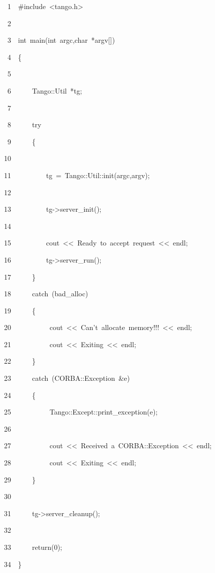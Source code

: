 \begin{lyxcode}
~~~~~1~~\#include~<tango.h>

~~~~~2~~

~~~~~3~~int~main(int~argc,char~{*}argv{[}{]})

~~~~~4~~\{

~~~~~5~~

~~~~~6~~~~~~Tango::Util~{*}tg;

~~~~~7~~~~~~~~~~

~~~~~8~~~~~~try

~~~~~9~~~~~~\{

~~~~10~~~~~~~~~~

~~~~11~~~~~~~~~~tg~=~Tango::Util::init(argc,argv);

~~~~12~~

~~~~13~~~~~~~~~~tg->server\_init();

~~~~14~~

~~~~15~~~~~~~~~~cout~<\textcompwordmark{}<~\textquotedbl{}Ready~to~accept~request\textquotedbl{}~<\textcompwordmark{}<~endl;

~~~~16~~~~~~~~~~tg->server\_run();

~~~~17~~~~~~\}

~~~~18~~~~~~catch~(bad\_alloc)

~~~~19~~~~~~\{

~~~~20~~~~~~~~~~~cout~<\textcompwordmark{}<~\textquotedbl{}Can't~allocate~memory!!!\textquotedbl{}~<\textcompwordmark{}<~endl;

~~~~21~~~~~~~~~~~cout~<\textcompwordmark{}<~\textquotedbl{}Exiting\textquotedbl{}~<\textcompwordmark{}<~endl;

~~~~22~~~~~~\}

~~~~23~~~~~~catch~(CORBA::Exception~\&e)

~~~~24~~~~~~\{

~~~~25~~~~~~~~~~~Tango::Except::print\_exception(e);

~~~~26~~~~~~~~~~~~~~~~~~

~~~~27~~~~~~~~~~~cout~<\textcompwordmark{}<~\textquotedbl{}Received~a~CORBA::Exception\textquotedbl{}~<\textcompwordmark{}<~endl;

~~~~28~~~~~~~~~~~cout~<\textcompwordmark{}<~\textquotedbl{}Exiting\textquotedbl{}~<\textcompwordmark{}<~endl;

~~~~29~~~~~~\}

~~~~30~~

~~~~31~~~~~~tg->server\_cleanup();

~~~~32~~~~~~~~~~~~~~~~~~

~~~~33~~~~~~return(0);

~~~~34~~\}
\end{lyxcode}

